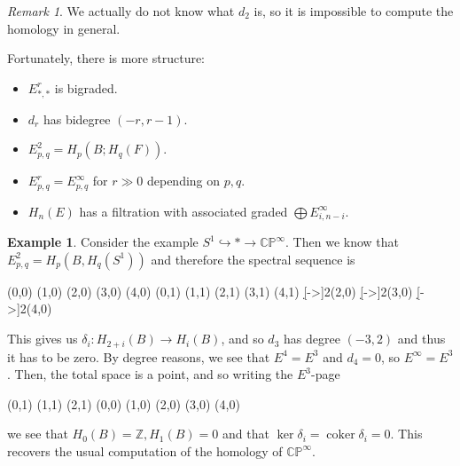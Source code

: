 \documentclass[leqno, openany]{memoir}
\theoremstyle{definition}
\newtheorem{exm}[thm]{Example}
\theoremstyle{remark}
\newtheorem{rmk}[thm]{Remark}
\theoremstyle{plain}
\theoremstyle{definition}
\theoremstyle{remark}
\newcommand{\C}{\mathbb{C}}
\newcommand{\Z}{\mathbb{Z}}
\renewcommand{\P}{\mathbb{P}}
\DeclareMathOperator{\coker}{coker}
\begin{document}
\begin{rmk} We actually do not know what $d_2$ is, so it is impossible to
compute the homology in general.  \end{rmk}

Fortunately, there is more structure: \begin{itemize} \item $E^r_{*,*}$ is
    bigraded.  \item $d_r$ has bidegree $(-r, r-1)$.  \item $E_{p,q}^2 = H_p(B;
    H_q(F))$.  \item $E_{p,q}^r = E_{p,q}^{\infty}$ for $r \gg 0$ depending on
    $p,q$.  \item $H_n(E)$ has a filtration with associated graded $\bigoplus
    E_{i, n-i}^{\infty}$.  \end{itemize}

\begin{exm} Consider the example $S^1 \hookrightarrow * \to \C\P^{\infty}$.
    Then we know that $E_{p,q}^2 = H_p(B, H_q(S^1))$ and therefore the spectral
    sequence is \begin{center}
        \begin{sseqdata}[classes={draw=none},name=cpinf,homological Serre
            grading,xscale=1.8, y axis gap = 2em] \class["H_0(B)"](0,0)
            \class["H_1(B)"](1,0) \class["H_2(B)"](2,0) \class["H_3(B)"](3,0)
            \class["\ldots"](4,0) \class["H_0(B)"](0,1) \class["H_1(B)"](1,1)
            \class["H_2(B)"](2,1) \class["H_3(B)"](3,1) \class["\ldots"](4,1)
        \d[->]2(2,0) \d[->]2(3,0) \d[->]2(4,0) \end{sseqdata}
    \printpage[name=cpinf,page=2, grid=chess] \end{center} This gives us
    $\delta_i \colon H_{2+i}(B) \to H_i(B)$, and so $d_3$ has degree $(-3, 2)$
    and thus it has to be zero. By degree reasons, we see that $E^4 = E^3$ and
    $d_4 = 0$, so $E^{\infty} = E^3$. Then, the total space is a point, and so
    writing the $E^3$-page \begin{center}
        \begin{sseqdata}[classes={draw=none},name=cpinf3,homological Serre
            grading,xscale=1.8, y axis gap = 2em] \class["\coker
            \delta_0"](0,1) \class["\coker \delta_1"](1,1) \class["\coker
            \delta_2"](2,1) \class["H_0(B)"](0,0) \class["H_1(B)"](1,0)
        (2,0) (3,0) (4,0) \end{sseqdata} \printpage[name=cpinf3, page=3, grid=chess]
\end{center} we see that $H_0(B) = \Z, H_1(B) = 0$ and that $\ker \delta_i =
\operatorname{coker} \delta_i = 0$. This recovers the usual computation of the
homology of $\C\P^{\infty}$.  \end{exm}
\end{document}
